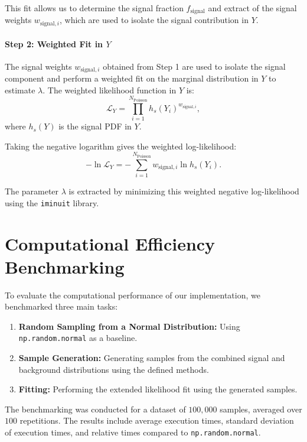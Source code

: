 \documentclass[11pt, a4paper]{article}
\begin{document}
This fit allows us to determine the signal fraction \( f_{\text{signal}} \) and extract of the signal weights \( w_{\text{signal},i} \), which are used to isolate the signal contribution in \( Y \).

\paragraph{Step 2: Weighted Fit in \( Y \)}  
The signal weights \( w_{\text{signal},i} \) obtained from Step 1 are used to isolate the signal component and perform a weighted fit on the marginal distribution in \( Y \) to estimate \( \lambda \). The weighted likelihood function in \( Y \) is:
\begin{equation}
    \mathcal{L}_Y = \prod_{i=1}^{N_{\text{Poisson}}} h_s(Y_i)^{w_{\text{signal},i}},
\end{equation}
where \( h_s(Y) \) is the signal PDF in \( Y \).

Taking the negative logarithm gives the weighted log-likelihood:
\begin{equation}
    -\ln \mathcal{L}_Y = -\sum_{i=1}^{N_{\text{Poisson}}} w_{\text{signal},i} \ln h_s(Y_i).
\end{equation}

The parameter \( \lambda \) is extracted by minimizing this weighted negative log-likelihood using the \texttt{iminuit} library.



\section{Computational Efficiency Benchmarking}

To evaluate the computational performance of our implementation, we benchmarked three main tasks:
\begin{enumerate}
    \item \textbf{Random Sampling from a Normal Distribution:} Using \texttt{np.random.normal} as a baseline.
    \item \textbf{Sample Generation:} Generating samples from the combined signal and background distributions using the defined methods.
    \item \textbf{Fitting:} Performing the extended likelihood fit using the generated samples.
\end{enumerate}

The benchmarking was conducted for a dataset of \( 100,000 \) samples, averaged over \( 100 \) repetitions. The results include average execution times, standard deviation of execution times, and relative times compared to \texttt{np.random.normal}.
\end{document}
